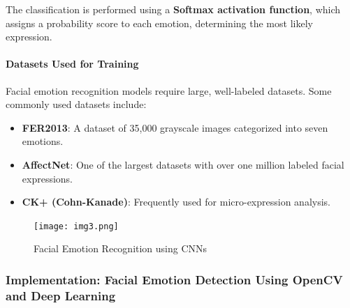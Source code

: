 \documentclass[a4paper,10pt]{article}
\begin{document}
The classification is performed using a \textbf{Softmax activation function}, which assigns a probability score to each emotion, determining the most likely expression.

\paragraph{Datasets Used for Training}
Facial emotion recognition models require large, well-labeled datasets. Some commonly used datasets include:
\begin{itemize}
    \item \textbf{FER2013}: A dataset of 35,000 grayscale images categorized into seven emotions.
    \item \textbf{AffectNet}: One of the largest datasets with over one million labeled facial expressions.
    \item \textbf{CK+ (Cohn-Kanade)}: Frequently used for micro-expression analysis.
\end{itemize}

\begin{figure}[h]
    \centering
    \texttt{[image: img3.png]}
    \caption{Facial Emotion Recognition using CNNs}
\end{figure}

\subsubsection{Implementation: Facial Emotion Detection Using OpenCV and Deep Learning}
\end{document}
